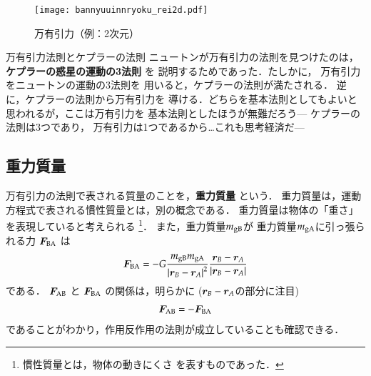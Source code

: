                 \begin{figure}[hbt]
                    \begin{center}
                        \texttt{[image: bannyuuinnryoku\_rei2d.pdf]}
                        \caption{万有引力（例：2次元）}
                        \label{fig:bannyuuinnryoku_rei2d}
                    \end{center}
                \end{figure}

            \begin{memo}{万有引力法則とケプラーの法則}
                ニュートンが万有引力の法則を見つけたのは，
                \textbf{ケプラーの惑星の運動の3法則} を
                説明するためであった．たしかに，
                万有引力をニュートンの運動の3法則を
                用いると，ケプラーの法則が満たされる．
                逆に，ケプラーの法則から万有引力を
                導ける．どちらを基本法則としてもよいと
                思われるが，ここは万有引力を
                基本法則としたほうが無難だろう---
                ケプラーの法則は3つであり，
                万有引力は1つであるから…これも思考経済だ---
            \end{memo}

            \subsection{重力質量}
            万有引力の法則で表される質量のことを，\textbf{重力質量} という．
            重力質量は，運動方程式で表される慣性質量とは，別の概念である．
            重力質量は物体の「重さ」を表現していると考えられる
                \footnote{
                    慣性質量とは，物体の動きにくさ を表すものであった．
                }．
            また，重力質量$m_{\rm{gB}}$が 重力質量$m_{\rm{gA}}$に引っ張られる力 $\boldsymbol{F}_{\rm{BA}}$ は
                \begin{align}
                    \boldsymbol{F}_{\rm{BA}}
                    =-G\frac{m_{\rm{gB}}m_{\rm{gA}}}{{\left| \boldsymbol{r}_{B}
                    -\boldsymbol{r}_{A} \right|}^{2}}
                    \frac{\boldsymbol{r}_{B}-\boldsymbol{r}_{A}}{\left| \boldsymbol{r}_{B}
                    -\boldsymbol{r}_{A} \right|}
                \end{align}
            である．
            $\boldsymbol{F}_{\rm{AB}}$ と $\boldsymbol{F}_{\rm{BA}}$ の関係は，明らかに
            ($\boldsymbol{r}_{B}-\boldsymbol{r}_{A}$の部分に注目)
                \begin{align}
                    \boldsymbol{F}_{\rm{AB}}=-\boldsymbol{F}_{\rm{BA}}
                \end{align}
            であることがわかり，作用反作用の法則が成立していることも確認できる．

